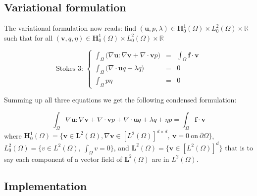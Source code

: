 \subsection{Variational formulation}
\label{sec:vari-form}

The variational formulation now reads: find $(\mathbf{u}, p,
\lambda) \in \mathbf{H}^1_0(\Omega) \times L^2_0(\Omega) \times
\mathbb{R}$ such that for all $(\mathbf{v}, q, \eta) \in
\mathbf{H}^1_0(\Omega) \times L^2_0(\Omega) \times \mathbb{R}$

\begin{equation}
  \label{notes:eq:20}
  \mbox{Stokes 3: }\left\{
    \begin{array}{rcl}
      \int_\Omega \Big(\nabla \mathbf{u} \colon \nabla \mathbf{v} + \nabla \cdot \mathbf{v} p\Big) &=& \int_\Omega \mathbf{f} \cdot \mathbf{v}\\
      \int_\Omega \Big(\nabla\cdot\mathbf{u} q + \lambda q\Big)   &=& 0\\
      \int_\Omega p \eta &=& 0
    \end{array}
  \right.
\end{equation}

Summing up all three equations we get the following condensed formulation:

\begin{equation}
  \label{notes:eq:19}
  \int_\Omega \nabla \mathbf{u} \colon \nabla \mathbf{v} + \nabla \cdot \mathbf{v} p + \nabla \cdot \mathbf{u} q + \lambda q + \eta p = \int_\Omega \mathbf{f} \cdot \mathbf{v}
\end{equation}
where $\mathbf{H}^1_0(\Omega)= \Big\{ \mathbf{v} \in \mathbf{L}^2(\Omega), \nabla \mathbf{v} \in [L^2(\Omega)]^{d\times d},\ \mathbf{v} = 0\ \text{on}\ \partial \Omega \Big\}$,
$L^2_0(\Omega)= \Big\{ v \in L^2(\Omega),\ \int_\Omega v = 0\Big\}$, and
$\mathbf{L}^2(\Omega)= \Big\{ \mathbf{v} \in [L^2(\Omega)]^d\Big\}$ that is to say each component of a  vector field of $\mathbf{L}^2(\Omega)$ are in $L^2(\Omega)$.


\subsection{Implementation}
\label{sec:implementation}


